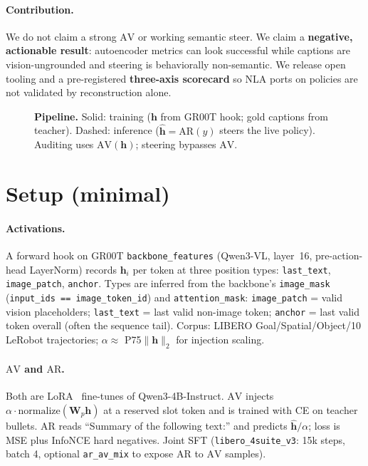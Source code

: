 \documentclass[10pt]{article}
\newcommand{\AV}{\ensuremath{\mathrm{AV}}}
\newcommand{\AR}{\ensuremath{\mathrm{AR}}}
\newcommand{\hvec}{\mathbf{h}}
\newcommand{\hhat}{\hat{\mathbf{h}}}
\newcommand{\code}[1]{\texttt{\small #1}}
\begin{document}
\paragraph{Contribution.}
We do not claim a strong \AV{} or working semantic steer.
We claim a \textbf{negative, actionable result}:
autoencoder metrics can look successful while captions are
vision-ungrounded and steering is behaviorally non-semantic.
We release open tooling and a pre-registered \textbf{three-axis scorecard}
so NLA ports on policies are not validated by reconstruction alone.

\begin{figure}[t]
  \centering
  \resizebox{\linewidth}{!}{}
  \caption{\textbf{Pipeline.} Solid: training (\(\hvec\) from GR00T hook;
  gold captions from teacher).
  Dashed: inference (\(\hhat=\AR(y)\) steers the live policy).
  Auditing uses \(\AV(\hvec)\); steering bypasses \(\AV\).}
  \label{fig:pipeline}
\end{figure}

\section{Setup (minimal)}
\label{sec:setup}

\paragraph{Activations.}
A forward hook on GR00T \code{backbone\_features} (Qwen3-VL, layer~16,
pre-action-head LayerNorm) records \(\hvec_i\) per token at three position
types: \code{last\_text}, \code{image\_patch}, \code{anchor}.
Types are inferred from the backbone's \code{image\_mask}
(\code{input\_ids == image\_token\_id}) and \code{attention\_mask}:
\code{image\_patch} = valid vision placeholders;
\code{last\_text} = last valid non-image token;
\code{anchor} = last valid token overall (often the sequence tail).
Corpus: LIBERO Goal/Spatial/Object/10 LeRobot trajectories;
\(\alpha \approx \) P75\(\|\hvec\|_2\) for injection scaling.

\paragraph{\AV{} and \AR{}.}
Both are LoRA~\citep{hu2022lora} fine-tunes of Qwen3-4B-Instruct.
\AV{} injects \(\alpha\cdot\mathrm{normalize}(\mathbf{W}_p\hvec)\) at a
reserved slot token and is trained with CE on teacher bullets.
\AR{} reads ``Summary of the following text:'' and predicts
\(\hhat/\alpha\); loss is MSE plus InfoNCE hard negatives.
Joint SFT (\code{libero\_4suite\_v3}: 15k steps, batch 4, optional
\code{ar\_av\_mix} to expose \AR{} to \AV{} samples).
\end{document}
